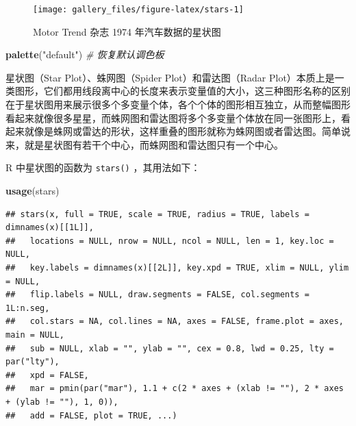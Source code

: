 \documentclass[
  b5paper,
  UTF8,twoside]{book}
\newenvironment{Shaded}{\begin{snugshade}}{\end{snugshade}}
\newcommand{\CommentTok}[1]{\textcolor[rgb]{0.56,0.35,0.01}{\textit{#1}}}
\newcommand{\FunctionTok}[1]{\textcolor[rgb]{0.13,0.29,0.53}{\textbf{#1}}}
\newcommand{\NormalTok}[1]{#1}
\newcommand{\StringTok}[1]{\textcolor[rgb]{0.31,0.60,0.02}{#1}}
\begin{document}
\begin{figure}

{\centering \texttt{[image: gallery\_files/figure-latex/stars-1]} 

}

\caption[Motor Trend 杂志 1974 年汽车数据的星状图]{Motor Trend 杂志 1974 年汽车数据的星状图}\label{fig:stars}
\end{figure}

\begin{Shaded}
\begin{Highlighting}[]
\FunctionTok{palette}\NormalTok{(}\StringTok{"default"}\NormalTok{) }\CommentTok{\# 恢复默认调色板}
\end{Highlighting}
\end{Shaded}

星状图（Star Plot）、蛛网图（Spider Plot）和雷达图（Radar Plot）本质上是一类图形，它们都用线段离中心的长度来表示变量值的大小，这三种图形名称的区别在于星状图用来展示很多个多变量个体，各个个体的图形相互独立，从而整幅图形看起来就像很多星星，而蛛网图和雷达图将多个多变量个体放在同一张图形上，看起来就像是蛛网或雷达的形状，这样重叠的图形就称为蛛网图或者雷达图。简单说来，就是星状图有若干个中心，而蛛网图和雷达图只有一个中心。

R 中星状图的函数为 \texttt{stars()} ，其用法如下：

\begin{Shaded}
\begin{Highlighting}[]
\FunctionTok{usage}\NormalTok{(stars)}
\end{Highlighting}
\end{Shaded}

\begin{verbatim}
## stars(x, full = TRUE, scale = TRUE, radius = TRUE, labels = dimnames(x)[[1L]],
##   locations = NULL, nrow = NULL, ncol = NULL, len = 1, key.loc = NULL,
##   key.labels = dimnames(x)[[2L]], key.xpd = TRUE, xlim = NULL, ylim = NULL,
##   flip.labels = NULL, draw.segments = FALSE, col.segments = 1L:n.seg,
##   col.stars = NA, col.lines = NA, axes = FALSE, frame.plot = axes, main = NULL,
##   sub = NULL, xlab = "", ylab = "", cex = 0.8, lwd = 0.25, lty = par("lty"),
##   xpd = FALSE,
##   mar = pmin(par("mar"), 1.1 + c(2 * axes + (xlab != ""), 2 * axes + (ylab != ""), 1, 0)),
##   add = FALSE, plot = TRUE, ...)
\end{verbatim}
\end{document}
